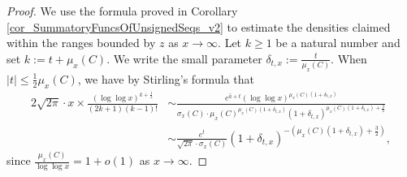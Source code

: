 \documentclass[11pt,reqno,a4letter]{article}
\numberwithin{figure}{section}
\numberwithin{table}{section}
\theoremstyle{plain}
\numberwithin{theorem}{section}
\theoremstyle{definition}
\begin{document}
\begin{proof}
We use the formula proved in Corollary \ref{cor_SummatoryFuncsOfUnsignedSeqs_v2} 
to estimate the densities claimed within the ranges bounded by 
$z$ as $x \rightarrow \infty$. 
Let $k \geq 1$ be a natural number and set $k := t + \mu_x(C)$. 
We write the small parameter $\delta_{t,x} := \frac{t}{\mu_x(C)}$. 
When $|t| \leq \frac{1}{2} \mu_x(C)$, we have by Stirling's formula that 
\begin{align*} 
2\sqrt{2\pi} \cdot x \times 
     \frac{(\log\log x)^{k+\frac{1}{2}}}{(2k+1)(k-1)!} & \sim 
     \frac{e^{\hat{a} + t} 
     (\log\log x)^{\mu_x(C)(1+\delta_{t,x})}}{ 
     \sigma_x(C) \cdot \mu_x(C)^{\mu_x(C) (1 + \delta_{t,x})}
     (1 + \delta_{t,x})^{\mu_x(C) (1 + \delta_{t,x}) + \frac{3}{2}}} \\ 
     & \sim \frac{e^{t}}{\sqrt{2\pi} \cdot \sigma_x(C)} (1 + \delta_{t,x})^{-\left( 
     \mu_x(C) (1 + \delta_{t,x}) + \frac{3}{2}\right)}, 
\end{align*} 
since $\frac{\mu_x(C)}{\log\log x} = 1 + o(1)$ as $x \rightarrow \infty$. 


\end{proof}
\end{document}
